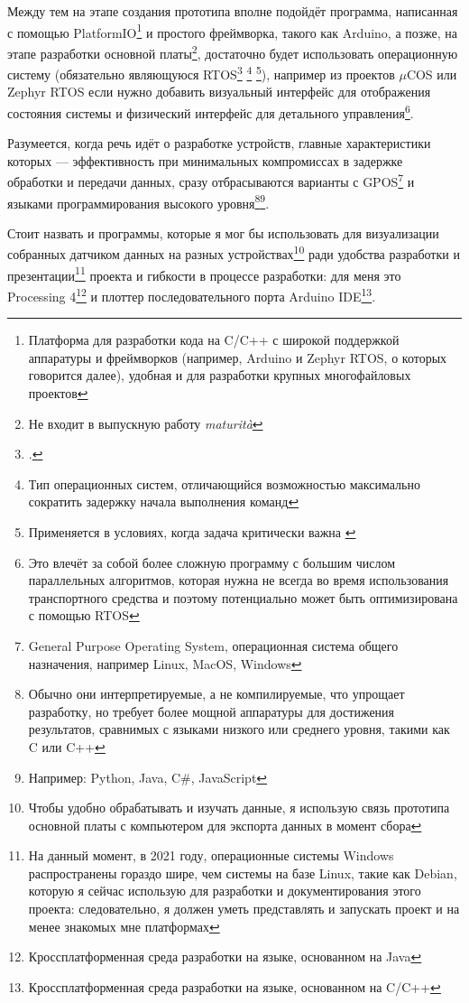\documentclass[a4paper, 10pt, final]{article} %
\newcommand{\parenciteit}[2]{\textit{\parencite[#1]{#2}}} %
\begin{document}
    Между тем на этапе создания прототипа вполне подойдёт программа, написанная с помощью PlatformIO\footnote{Платформа для разработки кода на C/C++ с широкой поддержкой аппаратуры и фреймворков (например, Arduino и Zephyr RTOS, о которых говорится далее), удобная и для разработки крупных многофайловых проектов} и простого фреймворка, такого как Arduino, а позже, на этапе разработки основной платы\footnote{Не входит в выпускную работу \emph{maturit\`{a}}}, достаточно будет использовать операционную систему (обязательно являющуюся RTOS\footcite[]{RTOS:Wiki} \footnote{Тип операционных систем, отличающийся возможностью максимально сократить задержку начала выполнения команд} \footnote{Применяется в условиях, когда задача критически важна \parenciteit{}{MissionCritical:Wiki}}), например из проектов $\mu$COS или Zephyr RTOS
    если нужно добавить визуальный интерфейс для отображения состояния системы и физический интерфейс для детального управления\footnote{Это влечёт за собой более сложную программу с большим числом параллельных алгоритмов, которая нужна не всегда во время использования транспортного средства и поэтому потенциально может быть оптимизирована с помощью RTOS}.

    Разумеется, когда речь идёт о разработке устройств, главные характеристики которых --- эффективность при минимальных компромиссах в задержке обработки и передачи данных, сразу отбрасываются варианты с GPOS\footnote{General Purpose Operating System, операционная система общего назначения, например Linux, MacOS, Windows} и языками программирования высокого уровня\footnote{Обычно они интерпретируемые, а не компилируемые, что упрощает разработку, но требует более мощной аппаратуры для достижения результатов, сравнимых с языками низкого или среднего уровня, такими как C или C++}\:\footnote{Например: Python, Java, C\#, JavaScript}.
    
    
    Стоит назвать и программы, которые я мог бы использовать для визуализации собранных датчиком данных на разных устройствах\footnote{Чтобы удобно обрабатывать и изучать данные, я использую связь прототипа основной платы с компьютером для экспорта данных в момент сбора} ради удобства разработки и презентации\footnote{На данный момент, в 2021 году, операционные системы Windows распространены гораздо шире, чем системы на базе Linux, такие как Debian, которую я сейчас использую для разработки и документирования этого проекта: следовательно, я должен уметь представлять и запускать проект и на менее знакомых мне платформах} проекта и гибкости в процессе разработки: для меня это Processing 4\footnote{Кроссплатформенная среда разработки на языке, основанном на Java} и плоттер последовательного порта Arduino IDE\footnote{Кроссплатформенная среда разработки на языке, основанном на C/C++}.
\end{document}
